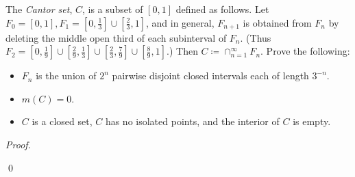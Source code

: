 \documentclass[12pt]{article}
\newenvironment{problem}[2][Problem]{\begin{trivlist}
\item[\hskip \labelsep {\bfseries #1}\hskip \labelsep {\bfseries
#2.}]}{\end{trivlist}}
\newenvironment{sol}
    {\emph{Proof.}
    }
    {
    \qed
    }
\begin{document}
\begin{problem}{40}
  The \textit{Cantor set}, $C$, is a subset of $[0,1]$ defined as follows. Let $F_0 = [0,1], F_1 = [0,\frac{1}{3}]\cup[\frac{2}{3},1]$, and in general, $F_{n+1}$ is obtained from $F_n$ by deleting the middle open third of each subinterval of $F_n$. (Thus $F_2 = [0,\frac{1}{9}]\cup[\frac{2}{9},\frac{1}{3}]\cup[\frac{2}{3},\frac{7}{9}]\cup[\frac{8}{9},1]$.) Then $C \coloneqq \cap_{n = 1}^{\infty}F_n$. Prove the following:
  \begin{itemize}
    \item[(a)] $F_n$ is the union of $2^n$ pairwise disjoint closed intervals each of length $3^{-n}$.
    \item[(b)] $m(C) = 0$.
    \item[(c)] $C$ is a closed set, $C$ has no isolated points, and the interior of $C$ is empty.  
  \end{itemize}
\end{problem}
\begin{sol}
  
\end{sol}
\end{document}
